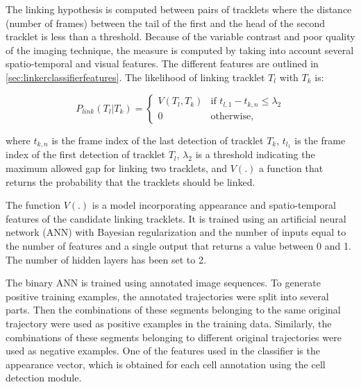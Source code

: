      	   	The linking hypothesis is computed between pairs of tracklets where the distance (number of frames) between the tail of the first and the head of the second tracklet is less than a threshold. Because of the variable contrast and poor quality of the imaging technique, the measure is computed by taking into account several spatio-temporal and visual features. The different features are outlined in \cref{sec:linkerclassifierfeatures}. The likelihood of linking tracklet $T_l$ with $T_k$ is:
     	   	
     	   	\[
     	   		P_{link}(T_l|T_k) = \begin{cases}
     	   			V(T_l, T_k)  & \text{if } t_{l,1} - t_{k,n} \leq \lambda_2 \\
     	   			0 & \text{otherwise,}
     	   		\end{cases}
     	   	\]
     	   	
     	   	\noindent where $t_{k,n}$ is the frame index of the last detection of tracklet $T_k$, $t_{l_1}$ is the frame index of the first detection of tracklet $T_l$, $\lambda_2$ is a threshold indicating the maximum allowed gap for linking two tracklets, and $V(.)$ a function that returns the probability that the tracklets should be linked.

     	   	The function $V(.)$ is a model incorporating appearance and spatio-temporal features of the candidate linking tracklets. It is trained using an artificial neural network (ANN) with Bayesian regularization and the number of inputs equal to the number of features and a single output that returns a value between 0 and 1. The number of hidden layers has been set to 2.
     	   	
     	   	The binary ANN is trained using annotated image sequences. To generate positive training examples, the annotated trajectories were split into several parts. Then the combinations of these segments belonging to the same original trajectory were used as positive examples in the training data. Similarly, the combinations of these segments belonging to different original trajectories were used as negative examples. One of the features used in the classifier is the appearance vector, which is obtained for each cell annotation using the cell detection module.
     	   	
